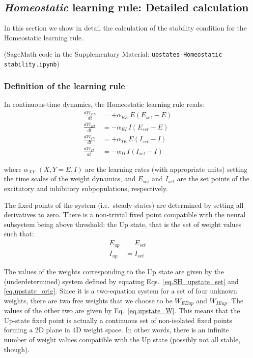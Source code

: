 \documentclass[twocolumn]{article}
\newcommand{\EE}{\mathit{EE}}
\newcommand{\EI}{\mathit{EI}}
\newcommand{\IE}{\mathit{IE}}
\newcommand{\II}{\mathit{II}}
\newcommand{\XY}{\mathit{XY}}
\newcommand{\set}{\mathit{set}}
\newcommand{\up}{\mathit{up}}
\begin{document}
\subsection{{\em Homeostatic} learning rule: Detailed calculation}
\label{sec.SH_details}

In this section we show in detail the calculation of the stability condition for the Homeostatic learning rule.

(SageMath code in the Supplementary Material: {\tt upstates-Homeostatic stability.ipynb})


\subsubsection{Definition of the learning rule}

In continuous-time dynamics, the Homeostatic learning rule reads:
\begin{equation}
\begin{aligned}
\frac{dW_{\EE}}{dt} & = +\alpha_{\EE} \, E (E_{\set} - E) \\
\frac{dW_{\EI}}{dt} & = -\alpha_{\EI} \, I (E_{\set} - E) \\
\frac{dW_{\IE}}{dt} & = +\alpha_{\IE} \, E (I_{\set} - I) \\
\frac{dW_{\II}}{dt} & = -\alpha_{\II} \, I (I_{\set} - I)
\end{aligned}
\label{eq.SH_equation}
\end{equation}

\noindent where $\alpha_{\XY}$ $(X,Y=E,I)$ are the learning rates (with appropriate units) setting the time scales of the weight dynamics, and $E_{\set}$ and $I_{\set}$ are the set points of the excitatory and inhibitory subpopulations, respectively.

The fixed points of the system (i.e.\ steady states) are determined by setting all derivatives to zero. There is a non-trivial fixed point compatible with the neural subsystem being above threshold: the Up state, that is the set of weight values such that:
\begin{equation}
\begin{aligned}
E_{\up} & = E_{\set} \\
I_{\up} & = I_{\set}
\end{aligned}
\label{eq.SH_upstate_set}
\end{equation}

\noindent The values of the weights corresponding to the Up state are given by the (underdetermined) system defined by equating Eqs.\ \ref{eq.SH_upstate_set} and \ref{eq.upstate_orig}. Since it is a two-equation system for a set of four unknown weights, there are two free weights that we choose to be $W_{\EE\up}$ and $W_{\IE\up}$. The values of the other two are given by Eq.\ \ref{eq.upstate_W}. This means that the Up-state fixed point is actually a continuous set of non-isolated fixed points forming a 2D plane in 4D weight space. In other words, there is an infinite number of weight values compatible with the Up state (possibly not all stable, though).
\end{document}
